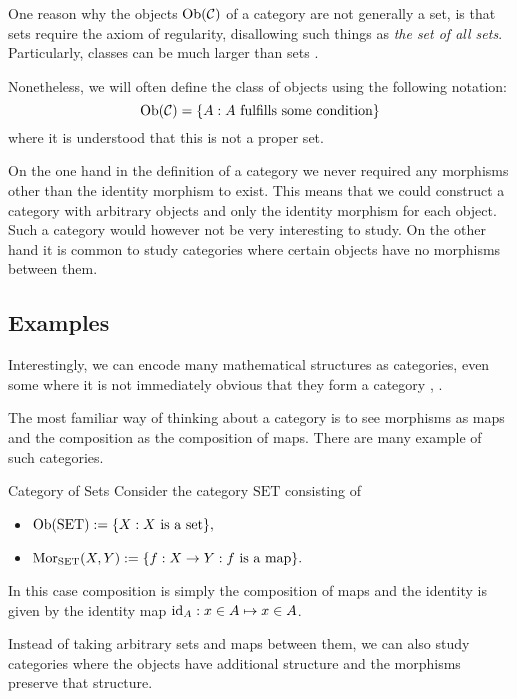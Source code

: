 One reason why the objects $\mathrm {Ob}(\mathcal{C})$ of a category are not generally a set, is that sets require the axiom of regularity, 
disallowing such things as \emph{the set of all sets}. Particularly, classes can be much larger than sets \cite[p.~1]{Roman2017}.

Nonetheless, we will often define the class of objects using the following notation:
$$
\mathrm {Ob}(\mathcal{C}) = \{A: \text{$A$ fulfills some condition}\}
$$
where it is understood that this is not a proper set.


On the one hand in the definition of a category we never required any morphisms other than the identity morphism to exist.
This means that we could construct a category with arbitrary objects and only the identity morphism for each object. 
Such a category would however not be very interesting to study.
On the other hand it is common to study categories where certain objects have no morphisms between them.

\subsection{Examples}

Interestingly, we can encode many mathematical structures as categories, even some where it is not immediately obvious that they form a category \cite[Chap.~1~Ex.~1-7]{Roman2017}, \cite[Sec.~1.1]{Leinster2014-dc}.

The most familiar way of thinking about a category is to see morphisms as maps and the composition as the composition of maps. There are many example of such categories.

\begin{example}{Category of Sets}{}
Consider the category $\mathrm{SET}$ consisting of
\begin{itemize}
    \item $\mathrm {Ob}(\mathrm{SET}) := \{X: \text{$X$ is a set}\},$
    \item $\mathrm {Mor}_{\mathrm{SET}}(X,Y) := \{f: X \to Y: \text{$f$ is a map}\}.$
\end{itemize}
In this case composition is simply the composition of maps and the identity is given by the identity map $\mathrm{id}_A: x \in A \mapsto x \in A$.
\end{example}

Instead of taking arbitrary sets and maps between them, we can also study categories where the objects have additional structure and the morphisms preserve that structure.

